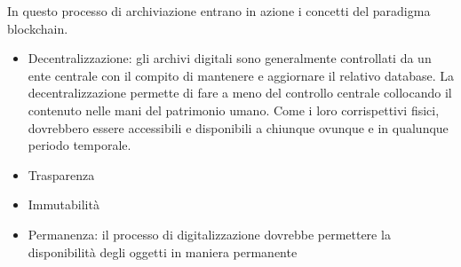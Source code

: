 In questo processo di archiviazione entrano in azione i concetti del paradigma blockchain. 

\begin{itemize}
\item Decentralizzazione: gli archivi digitali sono generalmente controllati da un ente centrale con il compito di mantenere e aggiornare il relativo database. La decentralizzazione permette di fare a meno del controllo centrale collocando il contenuto nelle mani del patrimonio umano. Come i loro corrispettivi fisici, dovrebbero essere accessibili e disponibili a chiunque ovunque e in qualunque periodo temporale.     
\item Trasparenza
\item Immutabilità
\item Permanenza: il processo di digitalizzazione dovrebbe permettere la disponibilità degli oggetti in maniera permanente  
\end{itemize}